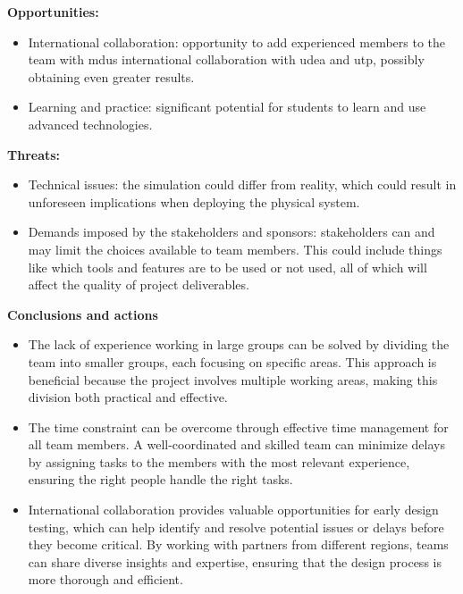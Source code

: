 \textbf{Opportunities:}
\begin{itemize}
    \item International collaboration: opportunity to add experienced members to the team with \ac{mdu}s international collaboration with \ac{udea} and \ac{utp}, possibly obtaining even greater results. 
    \item Learning and practice: significant potential for students to learn and use advanced technologies. 
\end{itemize}

\textbf{Threats:}
\begin{itemize}
    \item Technical issues: the simulation could differ from reality, which could result in unforeseen implications when deploying the physical system. 
    \item Demands imposed by the stakeholders and sponsors: stakeholders can and may limit the choices available to team members. This could include things like which tools and features are to be used or not used, all of which will affect the quality of project deliverables. 
\end{itemize}

\textbf{Conclusions and actions}
\begin{itemize}
   \item  The lack of experience working in large groups can be solved by dividing the team into smaller groups, each focusing on specific areas. This approach is beneficial because the project involves multiple working areas, making this division both practical and effective.
   \item The time constraint can be overcome through effective time management for all team members. A well-coordinated and skilled team can minimize delays by assigning tasks to the members with the most relevant experience, ensuring the right people handle the right tasks.
   \item International collaboration provides valuable opportunities for early design testing, which can help identify and resolve potential issues or delays before they become critical. By working with partners from different regions, teams can share diverse insights and expertise, ensuring that the design process is more thorough and efficient. 
\end{itemize}


\begin{comment}
\textbf{Conclusions:}
\begin{itemize}
    \item Need to secure additional funding and focus on continuous skills development
    \item Strategic alliances should be considered to mitigate weaknesses and threats
    \item Constant monitoring and lobbying required to navigate regulatory landscape
\end{itemize}
\end{comment}

